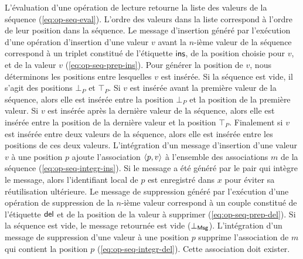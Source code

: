 L'évaluation d'une opération de lecture retourne la liste des valeurs de la séquence (\autoref{eq:op-seq-eval}).
L'ordre des valeurs dans la liste correspond à l'ordre de leur position dans la séquence.
Le message d'insertion généré par l'exécution d'une opération d'insertion d'une valeur $v$ avant la $n$-ième valeur de la séquence correspond à un triplet constitué de l'étiquette $\trm{ins}$, de la position choisie pour $v$, et de la valeur $v$ (\autoref{eq:op-seq-prep-ins}).
Pour générer la position de $v$, nous déterminons les positions entre lesquelles $v$ est insérée.
Si la séquence est vide, il s'agit des positions $\bot_P$ et $\top_P$.
Si $v$ est insérée avant la première valeur de la séquence, alors elle est insérée entre la position $\bot_P$ et la position de la première valeur.
Si $v$ est insérée après la dernière valeur de la séquence, alors elle est insérée entre la position de la dernière valeur et la position $\top_P$.
Finalement si $v$ est insérée entre deux valeurs de la séquence, alors elle est insérée entre les positions de ces deux valeurs.
L'intégration d'un message d'insertion d'une valeur $v$ à une position $p$ ajoute l'association $\tuple*{p, v}$ à l'ensemble des associations $m$ de la séquence (\autoref{eq:op-seq-integr-ins}).
Si le message a été généré par le pair qui intègre le message, alors l'identifiant local de $p$ est enregistré dans $x$ pour éviter sa réutilisation ultérieure.
Le message de suppression généré par l'exécution d'une opération de suppression de la $n$-ième valeur correspond à un couple constitué de l'étiquette $\trm{del}$ et de la position de la valeur à supprimer (\autoref{eq:op-seq-prep-del}).
Si la séquence est vide, le message retournée est vide ($\bot_{\trm{Msg}}$).
L'intégration d'un message de suppression d'une valeur à une position $p$ supprime l'association de $m$ qui contient la position $p$ (\autoref{eq:op-seq-integr-del}).
Cette association doit exister.

